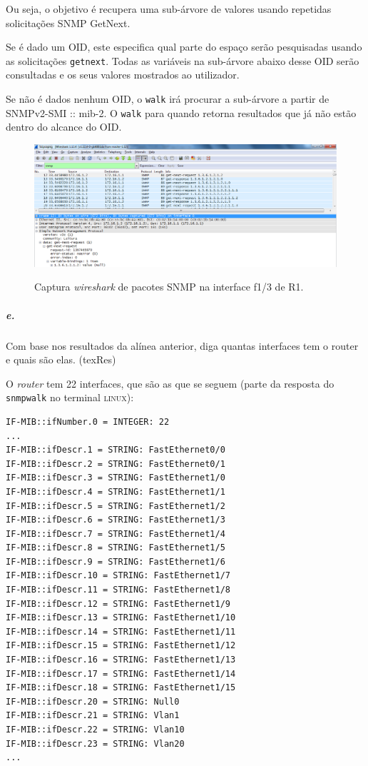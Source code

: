 Ou seja, o objetivo é recupera uma sub-árvore de valores usando repetidas solicitações SNMP GetNext.

Se é dado um OID, este especifica qual parte do espaço serão pesquisadas usando as solicitações \texttt{getnext}. Todas as variáveis na sub-árvore abaixo desse OID serão consultadas e os seus valores mostrados ao utilizador.

Se não é dados nenhum OID, o \texttt{walk} irá procurar a sub-árvore a partir de SNMPv2-SMI :: mib-2.
O \texttt{walk} para quando retorna resultados que já não estão dentro do alcance do OID.

\begin{figure}[h]
\centering
\includegraphics[width=1\textwidth, height=0.3\textheight]{5d.png}
\label{fig:7-capturaWireshark}
\caption{Captura \emph{wireshark} de pacotes SNMP na interface \textsf{f1/3} de \textsf{R1}.}
\end{figure}

\newpage

\subparagraph{e.}
Com base nos resultados da alínea anterior, diga quantas interfaces tem o router e quais são elas. (texRes)

O \emph{router} tem 22 interfaces, que são as que se seguem (parte da resposta do \texttt{snmpwalk} no terminal \textsc{linux}):

\begin{verbatim}
IF-MIB::ifNumber.0 = INTEGER: 22
...
IF-MIB::ifDescr.1 = STRING: FastEthernet0/0
IF-MIB::ifDescr.2 = STRING: FastEthernet0/1
IF-MIB::ifDescr.3 = STRING: FastEthernet1/0
IF-MIB::ifDescr.4 = STRING: FastEthernet1/1
IF-MIB::ifDescr.5 = STRING: FastEthernet1/2
IF-MIB::ifDescr.6 = STRING: FastEthernet1/3
IF-MIB::ifDescr.7 = STRING: FastEthernet1/4
IF-MIB::ifDescr.8 = STRING: FastEthernet1/5
IF-MIB::ifDescr.9 = STRING: FastEthernet1/6
IF-MIB::ifDescr.10 = STRING: FastEthernet1/7
IF-MIB::ifDescr.11 = STRING: FastEthernet1/8
IF-MIB::ifDescr.12 = STRING: FastEthernet1/9
IF-MIB::ifDescr.13 = STRING: FastEthernet1/10
IF-MIB::ifDescr.14 = STRING: FastEthernet1/11
IF-MIB::ifDescr.15 = STRING: FastEthernet1/12
IF-MIB::ifDescr.16 = STRING: FastEthernet1/13
IF-MIB::ifDescr.17 = STRING: FastEthernet1/14
IF-MIB::ifDescr.18 = STRING: FastEthernet1/15
IF-MIB::ifDescr.20 = STRING: Null0
IF-MIB::ifDescr.21 = STRING: Vlan1
IF-MIB::ifDescr.22 = STRING: Vlan10
IF-MIB::ifDescr.23 = STRING: Vlan20
...
\end{verbatim}


